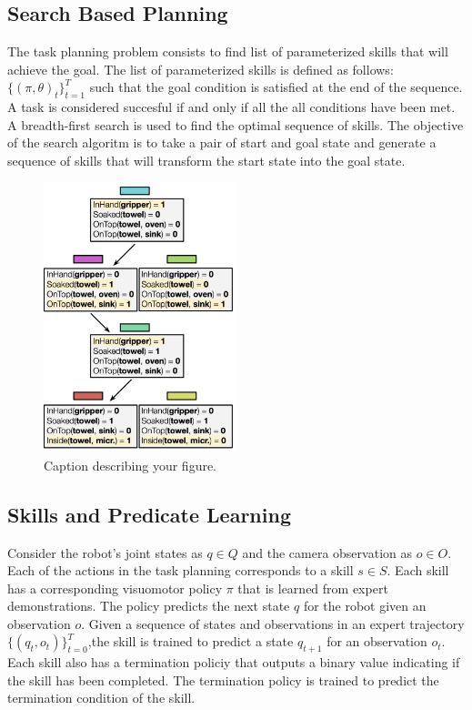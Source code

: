 \documentclass[
	a4paper, %
	10pt, %
	unnumberedsections, %
	twoside, %
]{LTJournalArticle}
\begin{document}
\subsection{Search Based Planning}
The task planning problem consists to find list of parameterized skills that will achieve the goal. The list of parameterized skills is
defined as follows: \(\{(\pi, \theta)_t\}^T_{t=1}\) such that the goal condition is satisfied at the end of the sequence. A task is considered
succesful if and only if all the all conditions have been met. A breadth-first search is used to find the optimal sequence of skills. The objective
of the search algoritm is to take a pair of start and goal state and generate a sequence of skills that will transform the start state into the goal state.
\begin{figure}[htb]
	\centering
	\includegraphics[width=0.5\textwidth]{figures/bfs_predicates.png}
	\caption{Caption describing your figure.}
	\label{fig:bfspredicates}
  \end{figure}
  

\subsection{Skills and Predicate Learning}

Consider the robot's joint states as \(q \in Q\) and the camera observation as \(o \in O\). Each of the actions in the task planning corresponds
to a skill \(s \in S\). Each skill has a corresponding visuomotor policy \(\pi\) that is learned from expert demonstrations. The policy predicts the
next state \(q\) for the robot given an observation \(o\). Given a sequence of states and observations in an expert trajectory \(\{(q_t, o_t)\}^T_{t=0}\),the
skill is trained to predict a state \(q_{t+1}\) for an observation \(o_t\). Each skill also has a termination policiy that outputs a binary value indicating
if the skill has been completed. The termination policy is trained to predict the termination condition of the skill. 
\end{document}
